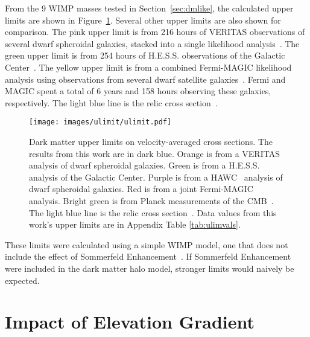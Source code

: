   From the 9 WIMP masses tested in Section~\ref{sec:dmlike}, the calculated upper limits are shown in Figure~\ref{fig:ulim}.
  Several other upper limits are also shown for comparison.
  The pink upper limit is from 216 hours of VERITAS observations of several dwarf spheroidal galaxies, stacked into a single likelihood analysis~\cite{verdsphul}.
  The green upper limit is from 254 hours of H.E.S.S. observations of the Galactic Center~\cite{hessgcul}.
  The yellow upper limit is from a combined Fermi-MAGIC likelihood analysis using observations from several dwarf satellite galaxies~\cite{fermagicul}.
  Fermi and MAGIC spent a total of 6 years and 158 hours observing these galaxies, respectively.
  The light blue line is the relic cross section~\cite{updatedWIMPRelicCrossSection}.
  
  \begin{figure}[ht]
    \centering
    \texttt{[image: images/ulimit/ulimit.pdf]}
    \caption[Dark Matter Upper Limit Plot]{
      Dark matter upper limits on velocity-averaged cross sections.
      The results from this work are in dark blue.
      Orange is from a VERITAS~\cite{veritas_dm_limit} analysis of dwarf spheroidal galaxies.
      Green is from a H.E.S.S.~\cite{hess_dm_limit} analysis of the Galactic Center.
      Purple is from a HAWC~\cite{hawc_dm_limit} analysis of dwarf spheroidal galaxies.
      Red is from a joint Fermi-MAGIC~\cite{fermagicul} analysis.
      Bright green is from Planck measurements of the CMB~\cite{planck_dm_limit}.
      The light blue line is the relic cross section~\cite{updatedWIMPRelicCrossSection}.
      Data values from this work's upper limits are in Appendix Table \ref{tab:ulimvals}.
    }
    \label{fig:ulim}
  \end{figure}
  
  These limits were calculated using a simple WIMP model, one that does not include the effect of Sommerfeld Enhancement~\cite{sommerfeld}.
  If Sommerfeld Enhancement were included in the dark matter halo model, stronger limits would naively be expected.
  
\FloatBarrier

\section{Impact of Elevation Gradient}\label{sec:elevgradient}


